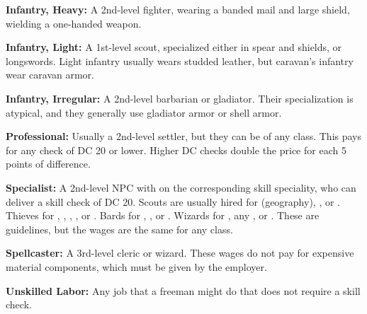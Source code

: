 \textbf{Infantry, Heavy:} A 2nd-level fighter, wearing a banded mail and large shield, wielding a one-handed weapon. 

\textbf{Infantry, Light:} A 1st-level scout, specialized either in spear and shields, or longswords. Light infantry usually wears studded leather, but caravan's infantry wear caravan armor.

\textbf{Infantry, Irregular:} A 2nd-level barbarian or gladiator. Their specialization is atypical, and they generally use gladiator armor or shell armor.

\textbf{Professional:} Usually a 2nd-level settler, but they can be of any class. This pays for any  check of DC 20 or lower. Higher DC checks double the price for each 5 points of difference.

\textbf{Specialist:} A 2nd-level NPC with  on the corresponding skill speciality, who can deliver a skill check of DC 20. Scouts are usually hired for  (geography), , or . Thieves for , , , , or . Bards for , , or . Wizards for , any , or . These are guidelines, but the wages are the same for any class.

\textbf{Spellcaster:} A 3rd-level cleric or wizard. These wages do not pay for expensive material components, which must be given by the employer.

\textbf{Unskilled Labor:} Any job that a freeman might do that does not require a skill check.
